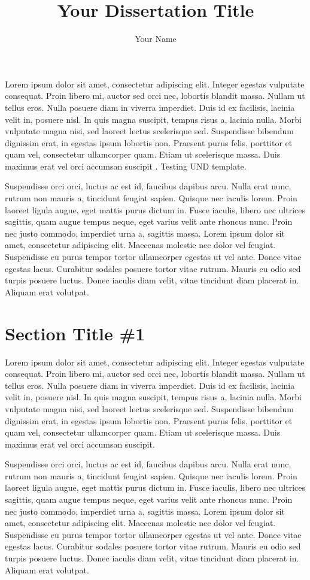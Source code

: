 \documentclass[phd]{und-thesis}
\title{Your Dissertation Title}
\author{Your Name}
\begin{document}

Lorem ipsum dolor sit amet, consectetur adipiscing elit. Integer egestas vulputate consequat. Proin libero mi, auctor sed orci nec, lobortis blandit massa. Nullam ut tellus eros. Nulla posuere diam in viverra imperdiet. Duis id ex facilisis, lacinia velit in, posuere nisl. In quis magna suscipit, tempus risus a, lacinia nulla. Morbi vulputate magna nisi, sed laoreet lectus scelerisque sed. Suspendisse bibendum dignissim erat, in egestas ipsum lobortis non. Praesent purus felis, porttitor et quam vel, consectetur ullamcorper quam. Etiam ut scelerisque massa. Duis maximus erat vel orci accumsan suscipit \cite{Schor2019}. Testing \gls{UND} template. 

Suspendisse orci orci, luctus ac est id, faucibus dapibus arcu. Nulla erat nunc, rutrum non mauris a, tincidunt feugiat sapien. Quisque nec iaculis lorem. Proin laoreet ligula augue, eget mattis purus dictum in. Fusce iaculis, libero nec ultrices sagittis, quam augue tempus neque, eget varius velit ante rhoncus nunc. Proin nec justo commodo, imperdiet urna a, sagittis massa. Lorem ipsum dolor sit amet, consectetur adipiscing elit. Maecenas molestie nec dolor vel feugiat. Suspendisse eu purus tempor tortor ullamcorper egestas ut vel ante. Donec vitae egestas lacus. Curabitur sodales posuere tortor vitae rutrum. Mauris eu odio sed turpis posuere luctus. Donec iaculis diam velit, vitae tincidunt diam placerat in. Aliquam erat volutpat.

\section{Section Title \#1}

Lorem ipsum dolor sit amet, consectetur adipiscing elit. Integer egestas vulputate consequat. Proin libero mi, auctor sed orci nec, lobortis blandit massa. Nullam ut tellus eros. Nulla posuere diam in viverra imperdiet. Duis id ex facilisis, lacinia velit in, posuere nisl. In quis magna suscipit, tempus risus a, lacinia nulla. Morbi vulputate magna nisi, sed laoreet lectus scelerisque sed. Suspendisse bibendum dignissim erat, in egestas ipsum lobortis non. Praesent purus felis, porttitor et quam vel, consectetur ullamcorper quam. Etiam ut scelerisque massa. Duis maximus erat vel orci accumsan suscipit.

Suspendisse orci orci, luctus ac est id, faucibus dapibus arcu. Nulla erat nunc, rutrum non mauris a, tincidunt feugiat sapien. Quisque nec iaculis lorem. Proin laoreet ligula augue, eget mattis purus dictum in. Fusce iaculis, libero nec ultrices sagittis, quam augue tempus neque, eget varius velit ante rhoncus nunc. Proin nec justo commodo, imperdiet urna a, sagittis massa. Lorem ipsum dolor sit amet, consectetur adipiscing elit. Maecenas molestie nec dolor vel feugiat. Suspendisse eu purus tempor tortor ullamcorper egestas ut vel ante. Donec vitae egestas lacus. Curabitur sodales posuere tortor vitae rutrum. Mauris eu odio sed turpis posuere luctus. Donec iaculis diam velit, vitae tincidunt diam placerat in. Aliquam erat volutpat.
\end{document}
